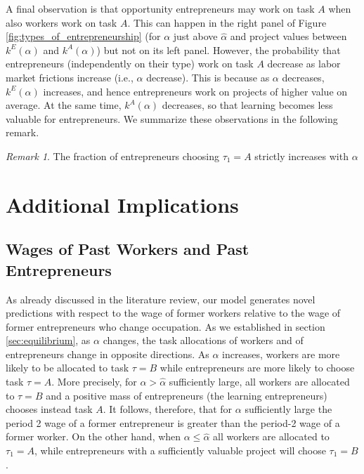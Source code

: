 \documentclass[12pt,american]{paper}
\theoremstyle{remark}
\newtheorem{remark}{Remark}
\begin{document}
A final observation is that opportunity entrepreneurs may work on task $A$ when also workers work on task $A$. This can happen in the right panel of Figure \ref{fig:types_of_entrepreneurship} (for $\alpha$ just above $\hat \alpha$ and project values between $k^E(\alpha)$ and $k^A(\alpha)$) but not on its left panel. However, the probability that entrepreneurs (independently on their type) work on task $A$ decrease as labor market frictions increase (i.e., $\alpha$ decrease). This is because as $\alpha$ decreases, $k^E(\alpha)$ increases, and hence entrepreneurs work on projects of higher value on average. At the same time, $k^A(\alpha)$ decreases, so that learning becomes less valuable for entrepreneurs. We summarize these observations in the following remark.

\begin{remark}
The fraction of entrepreneurs choosing $\tau_1=A$ strictly increases with $\alpha$
\end{remark}



\section{Additional Implications}\label{sec:implications}

\subsection{Wages of Past Workers and Past Entrepreneurs}\label{sec:wages of past workers vs entrepreneurs}

As already discussed in the literature review, our model generates novel predictions with respect to the wage of former workers relative to the wage of former entrepreneurs who change occupation.  As we established in section \ref{sec:equilibrium}, as $\alpha$ changes, the task allocations of workers and of entrepreneurs change in opposite directions. As $\alpha$ increases, workers are more likely to be allocated to task $\tau=B$ while entrepreneurs are more likely to choose task $\tau=A$.  More precisely, for $\alpha>\hat \alpha$ sufficiently large,  all workers are allocated to $\tau=B$ and a positive mass of entrepreneurs (the learning entrepreneurs) chooses instead task $A$. It follows, therefore, that for $\alpha$ sufficiently large the period 2 wage of a former entrepreneur is greater than the period-2 wage of a former worker. On the other hand, when $\alpha\leq \hat \alpha$ all workers are allocated to $\tau_1=A$, while entrepreneurs with a sufficiently valuable project will choose $\tau_1=B$. 
\end{document}
